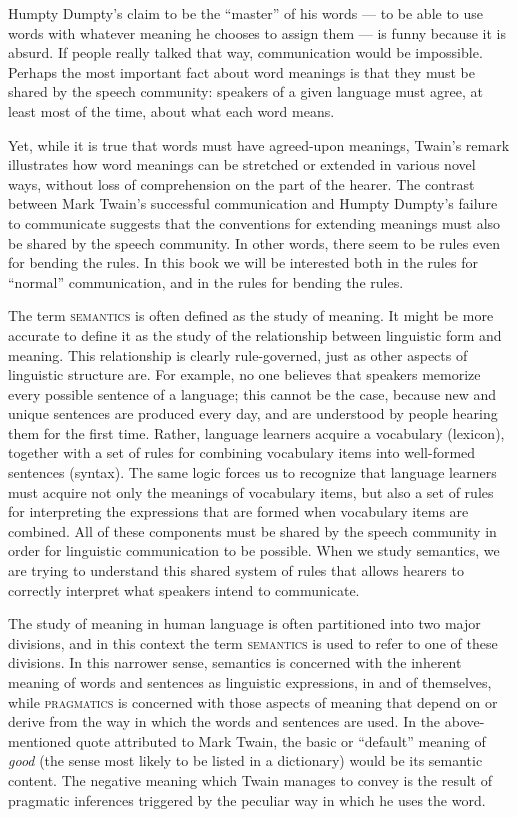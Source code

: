 Humpty Dumpty’s claim to be the “master” of his words — to be able to use words with whatever meaning he chooses to assign them — is funny because it is absurd. If people really talked that way, communication would be impossible. Perhaps the most important fact about word meanings is that they must be shared by the speech community: speakers of a given language must agree, at least most of the time, about what each word means.



Yet, while it is true that words must have agreed-upon meanings, Twain’s remark illustrates how word meanings can be stretched or extended in various novel ways, without loss of comprehension on the part of the hearer. The contrast between Mark Twain’s successful communication and Humpty Dumpty’s failure to communicate suggests that the conventions for extending meanings must also be shared by the speech community. In other words, there seem to be rules even for bending the rules. In this book we will be interested both in the rules for “normal” communication, and in the rules for bending the rules.



The term \textsc{semantics} is often defined as the study of meaning. It might be more accurate to define it as the study of the relationship between linguistic form and meaning. This relationship is clearly rule-governed, just as other aspects of linguistic structure are. For example, no one believes that speakers memorize every possible sentence of a language; this cannot be the case, because new and unique sentences are produced every day, and are understood by people hearing them for the first time. Rather, language learners acquire a vocabulary (lexicon), together with a set of rules for combining vocabulary items into well-formed sentences (syntax). The same logic forces us to recognize that language learners must acquire not only the meanings of vocabulary items, but also a set of rules for interpreting the expressions that are formed when vocabulary items are combined. All of these components must be shared by the speech community in order for linguistic communication to be possible. When we study semantics, we are trying to understand this shared system of rules that allows hearers to correctly interpret what speakers intend to communicate.


\largerpage
The study of meaning in human language is often partitioned into two major divisions, and in this context the term \textsc{semantics} is used to refer to one of these divisions. In this narrower sense, semantics is concerned with the inherent meaning of words and sentences as linguistic expressions, in and of themselves, while \textsc{pragmatics} is concerned with those aspects of meaning that depend on or derive from the way in which the words and sentences are used. In the above-mentioned quote attributed to Mark Twain, the basic or “default” meaning of \textit{good} (the sense most likely to be listed in a dictionary) would be its semantic content. The negative meaning which Twain manages to convey is the result of pragmatic inferences triggered by the peculiar way in which he uses the word.



